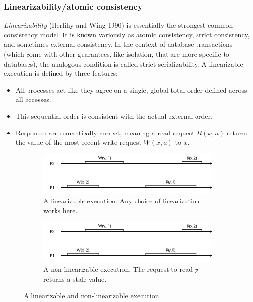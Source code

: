 \documentclass[]             %
{NASA}                       %
\theoremstyle{definition}
\providecommand{\tightlist}{%
  \setlength{\itemsep}{0pt}\setlength{\parskip}{0pt}}
\begin{document}
\hypertarget{linearizabilityatomic-consistency}{%
\subsubsection{Linearizability/atomic
consistency}\label{linearizabilityatomic-consistency}}

\emph{Linearizability} (Herlihy and Wing 1990) is essentially the
strongest common consistency model. It is known variously as atomic
consistency, strict consistency, and sometimes external consistency. In
the context of database transactions (which come with other guarantees,
like isolation, that are more specific to databases), the analogous
condition is called strict serializability. A linearizable execution is
defined by three features:

\begin{itemize}
\tightlist
\item
  All processes act like they agree on a single, global total order
  defined across all accesses.
\item
  This sequential order is consistent with the actual external order.
\item
  Responses are semantically correct, meaning a read request \(R(x, a)\)
  returns the value of the most recent write request \(W(x, a)\) to
  \(x\).
\end{itemize}

\begin{figure} \begin{subfigure}[a]{1\textwidth} \center
     \includegraphics[scale=0.4]{images/linear1.png} \caption{A
     linearizable execution. Any choice of linearization works here.}
     \label{fig:linear_example11} \end{subfigure}
     \begin{subfigure}[b]{1\textwidth} \center
     \includegraphics[scale=0.4]{images/nonlinear0.png} \caption{A
     non-linearizable execution. The request to read $y$ returns a
     stale value. } \label{fig:linear_example12} \end{subfigure}
     \caption{A linearizable and non-linearizable execution.}
     \label{fig:linear_example1} \end{figure}
\end{document}
